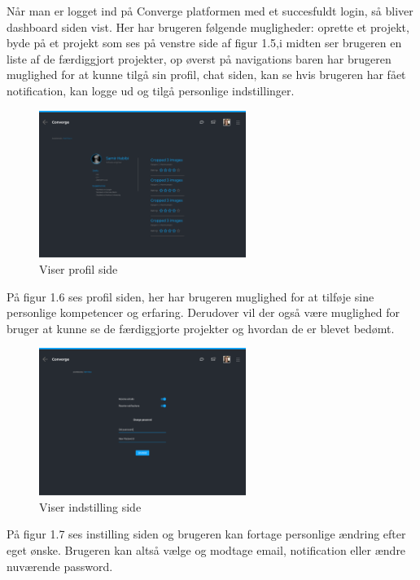 Når man er logget ind på Converge platformen med et succesfuldt login, så bliver dashboard siden vist. Her har brugeren følgende mugligheder: oprette et projekt, byde på et projekt som ses på venstre side af figur 1.5,i midten ser brugeren en liste af de færdiggjort projekter, op øverst på navigations baren har brugeren muglighed for at kunne tilgå sin profil, chat siden, kan se hvis brugeren har fået notification, kan logge ud og tilgå personlige indstillinger.

\newpage
\begin{figure}[ht]
    \centering
\includegraphics[width=0.6\textwidth]{system-interface-pdf/Portfolio.pdf}
\caption{Viser profil side}
\label{fig:figure2}
\end{figure}

På figur 1.6 ses profil siden, her har brugeren muglighed for at tilføje sine personlige kompetencer og erfaring. Derudover vil der også være muglighed for bruger at kunne se de færdiggjorte projekter og hvordan de er blevet bedømt. 

\begin{figure}[ht]
    \centering
\includegraphics[width=0.6\textwidth]{system-interface-pdf/Settings.pdf}
\caption{Viser indstilling side}
\label{fig:figure2}
\end{figure}

På figur 1.7 ses instilling siden og brugeren kan fortage personlige ændring efter eget ønske. Brugeren kan altså vælge og modtage email, notification eller ændre nuværende password.

